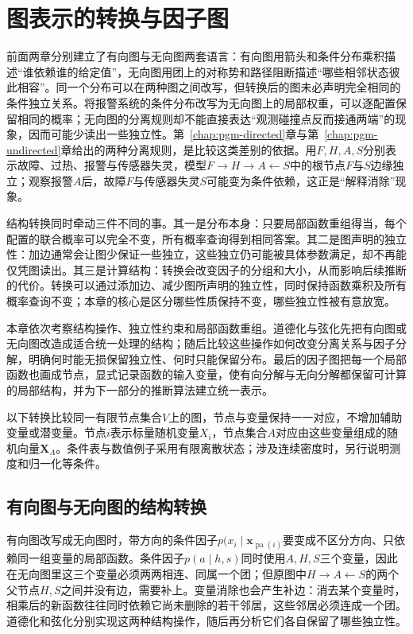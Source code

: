\chapter{图表示的转换与因子图}
\label{chap:pgm-representations}

前面两章分别建立了有向图与无向图两套语言：有向图用箭头和条件分布乘积描述“谁依赖谁的给定值”，无向图用团上的对称势和路径阻断描述“哪些相邻状态彼此相容”。同一个分布可以在两种图之间改写，但转换后的图未必声明完全相同的条件独立关系。将报警系统的条件分布改写为无向图上的局部权重，可以逐配置保留相同的概率；无向图的分离规则却不能直接表达“观测碰撞点反而接通两端”的现象，因而可能少读出一些独立性。第~\ref{chap:pgm-directed}章与第~\ref{chap:pgm-undirected}章给出的两种分离规则，是比较这类差别的依据。用$F,H,A,S$分别表示故障、过热、报警与传感器失灵，模型$F\to H\to A\leftarrow S$中的根节点$F$与$S$边缘独立；观察报警$A$后，故障$F$与传感器失灵$S$可能变为条件依赖，这正是“解释消除”现象。

结构转换同时牵动三件不同的事。其一是分布本身：只要局部函数重组得当，每个配置的联合概率可以完全不变，所有概率查询得到相同答案。其二是图声明的独立性：加边通常会让图少保证一些独立，这些独立仍可能被具体参数满足，却不再能仅凭图读出。其三是计算结构：转换会改变因子的分组和大小，从而影响后续推断的代价。转换可以通过添加边、减少图所声明的独立性，同时保持函数乘积及所有概率查询不变；本章的核心是区分哪些性质保持不变，哪些独立性被有意放宽。

本章依次考察结构操作、独立性约束和局部函数重组。道德化与弦化先把有向图或无向图改造成适合统一处理的结构；随后比较这些操作如何改变分离关系与因子分解，明确何时能无损保留独立性、何时只能保留分布。最后的因子图把每一个局部函数也画成节点，显式记录函数的输入变量，使有向分解与无向分解都保留可计算的局部结构，并为下一部分的推断算法建立统一表示。

以下转换比较同一有限节点集合$V$上的图，节点与变量保持一一对应，不增加辅助变量或潜变量。节点$i$表示标量随机变量$X_i$，节点集合$A$对应由这些变量组成的随机向量$\bm{X}_A$。条件表与数值例子采用有限离散状态；涉及连续密度时，另行说明测度和归一化等条件。

\section{有向图与无向图的结构转换}
\label{sec:pgm-representations-structural-conversions}

有向图改写成无向图时，带方向的条件因子$p(x_i\mid\bm{x}_{\operatorname{pa}(i)}$要变成不区分方向、只依赖同一组变量的局部函数。条件因子$p(a\mid h,s)$同时使用$A,H,S$三个变量，因此在无向图里这三个变量必须两两相连、同属一个团；但原图中$H\to A\leftarrow S$的两个父节点$H,S$之间并没有边，需要补上。变量消除也会产生补边：消去某个变量时，相乘后的新函数往往同时依赖它尚未删除的若干邻居，这些邻居必须连成一个团。道德化和弦化分别实现这两种结构操作，随后再分析它们各自保留了哪些独立性。

